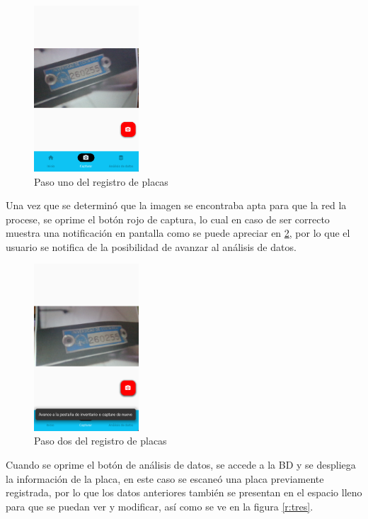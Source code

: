 \begin{figure}[H]
    \centering
    \includegraphics[width=0.35\textwidth]{imagenes/resultados/uno.png}
    \caption{Paso uno del registro de placas}
    \label{r:uno}
\end{figure}
\par
Una vez que se determinó que la imagen se encontraba apta para que la red la procese, se oprime el botón rojo de captura, lo cual en caso de ser correcto muestra una notificación en pantalla como se puede apreciar en \ref{r:dos}, por lo que el usuario se notifica de la posibilidad de avanzar al análisis de datos.
\begin{figure}[H]
    \centering
    \includegraphics[width=0.35\textwidth]{imagenes/resultados/dos.png}
    \caption{Paso dos del registro de placas}
    \label{r:dos}
\end{figure}
\par
Cuando se oprime el botón de análisis de datos, se accede a la BD y se despliega la información de la placa, en este caso se escaneó una placa previamente registrada, por lo que los datos anteriores también se presentan en el espacio lleno para que se puedan ver y modificar, así como se ve en la figura \ref{r:tres}.

